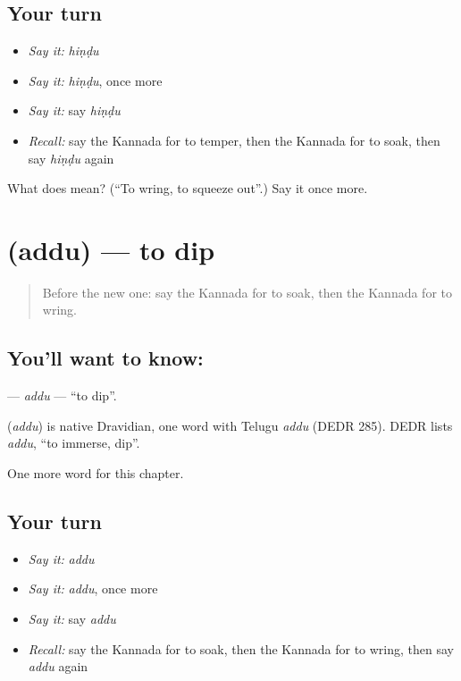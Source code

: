\subsection*{Your turn}
\begin{itemize}
\raggedright
  \item \emph{Say it:} \emph{hiṇḍu}
  \item \emph{Say it:} \emph{hiṇḍu}, once more
  \item \emph{Say it:} say \emph{hiṇḍu}
  \item \emph{Recall:} say the Kannada for to temper, then the Kannada for to soak, then say \emph{hiṇḍu} again
\end{itemize}

\begin{tcolorbox}[breakable,colback=teal!4,colframe=teal!35!black,title={Before you move on}]
What does  mean? (\textquotedblleft{}To wring, to squeeze out\textquotedblright{}.) Say it once more.
\end{tcolorbox}
\section[\texorpdfstring{\kn{ಅದ್ದು} (addu)}{ಅದ್ದು (addu)}]{ (addu) — to dip}

\label{lesson:KA-C242-addu}



\begin{quote}
Before the new one: say the Kannada for to soak, then the Kannada for to wring.
\end{quote}

\subsection*{You'll want to know: }
\textbf{} — \emph{addu} — \textquotedblleft{}to dip\textquotedblright{}.

\begin{cousinweb}
\textbf{} (\emph{addu}) is native Dravidian, one word with Telugu \emph{addu} (DEDR 285). DEDR lists \emph{addu}, \textquotedblleft{}to immerse, dip\textquotedblright{}.
\end{cousinweb}

\begin{grammarlens}[title={What you've built}]
One more word for this chapter.
\end{grammarlens}

\subsection*{Your turn}
\begin{itemize}
\raggedright
  \item \emph{Say it:} \emph{addu}
  \item \emph{Say it:} \emph{addu}, once more
  \item \emph{Say it:} say \emph{addu}
  \item \emph{Recall:} say the Kannada for to soak, then the Kannada for to wring, then say \emph{addu} again
\end{itemize}

